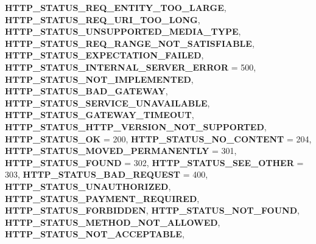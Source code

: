 \begin{DoxyCompactItemize}
{\bfseries H\+T\+T\+P\+\_\+\+S\+T\+A\+T\+U\+S\+\_\+\+R\+E\+Q\+\_\+\+E\+N\+T\+I\+T\+Y\+\_\+\+T\+O\+O\+\_\+\+L\+A\+R\+GE}, 
\newline
{\bfseries H\+T\+T\+P\+\_\+\+S\+T\+A\+T\+U\+S\+\_\+\+R\+E\+Q\+\_\+\+U\+R\+I\+\_\+\+T\+O\+O\+\_\+\+L\+O\+NG}, 
{\bfseries H\+T\+T\+P\+\_\+\+S\+T\+A\+T\+U\+S\+\_\+\+U\+N\+S\+U\+P\+P\+O\+R\+T\+E\+D\+\_\+\+M\+E\+D\+I\+A\+\_\+\+T\+Y\+PE}, 
{\bfseries H\+T\+T\+P\+\_\+\+S\+T\+A\+T\+U\+S\+\_\+\+R\+E\+Q\+\_\+\+R\+A\+N\+G\+E\+\_\+\+N\+O\+T\+\_\+\+S\+A\+T\+I\+S\+F\+I\+A\+B\+LE}, 
{\bfseries H\+T\+T\+P\+\_\+\+S\+T\+A\+T\+U\+S\+\_\+\+E\+X\+P\+E\+C\+T\+A\+T\+I\+O\+N\+\_\+\+F\+A\+I\+L\+ED}, 
\newline
{\bfseries H\+T\+T\+P\+\_\+\+S\+T\+A\+T\+U\+S\+\_\+\+I\+N\+T\+E\+R\+N\+A\+L\+\_\+\+S\+E\+R\+V\+E\+R\+\_\+\+E\+R\+R\+OR} = 500, 
{\bfseries H\+T\+T\+P\+\_\+\+S\+T\+A\+T\+U\+S\+\_\+\+N\+O\+T\+\_\+\+I\+M\+P\+L\+E\+M\+E\+N\+T\+ED}, 
{\bfseries H\+T\+T\+P\+\_\+\+S\+T\+A\+T\+U\+S\+\_\+\+B\+A\+D\+\_\+\+G\+A\+T\+E\+W\+AY}, 
{\bfseries H\+T\+T\+P\+\_\+\+S\+T\+A\+T\+U\+S\+\_\+\+S\+E\+R\+V\+I\+C\+E\+\_\+\+U\+N\+A\+V\+A\+I\+L\+A\+B\+LE}, 
\newline
{\bfseries H\+T\+T\+P\+\_\+\+S\+T\+A\+T\+U\+S\+\_\+\+G\+A\+T\+E\+W\+A\+Y\+\_\+\+T\+I\+M\+E\+O\+UT}, 
{\bfseries H\+T\+T\+P\+\_\+\+S\+T\+A\+T\+U\+S\+\_\+\+H\+T\+T\+P\+\_\+\+V\+E\+R\+S\+I\+O\+N\+\_\+\+N\+O\+T\+\_\+\+S\+U\+P\+P\+O\+R\+T\+ED}, 
{\bfseries H\+T\+T\+P\+\_\+\+S\+T\+A\+T\+U\+S\+\_\+\+OK} = 200, 
{\bfseries H\+T\+T\+P\+\_\+\+S\+T\+A\+T\+U\+S\+\_\+\+N\+O\+\_\+\+C\+O\+N\+T\+E\+NT} = 204, 
\newline
{\bfseries H\+T\+T\+P\+\_\+\+S\+T\+A\+T\+U\+S\+\_\+\+M\+O\+V\+E\+D\+\_\+\+P\+E\+R\+M\+A\+N\+E\+N\+T\+LY} = 301, 
{\bfseries H\+T\+T\+P\+\_\+\+S\+T\+A\+T\+U\+S\+\_\+\+F\+O\+U\+ND} = 302, 
{\bfseries H\+T\+T\+P\+\_\+\+S\+T\+A\+T\+U\+S\+\_\+\+S\+E\+E\+\_\+\+O\+T\+H\+ER} = 303, 
{\bfseries H\+T\+T\+P\+\_\+\+S\+T\+A\+T\+U\+S\+\_\+\+B\+A\+D\+\_\+\+R\+E\+Q\+U\+E\+ST} = 400, 
\newline
{\bfseries H\+T\+T\+P\+\_\+\+S\+T\+A\+T\+U\+S\+\_\+\+U\+N\+A\+U\+T\+H\+O\+R\+I\+Z\+ED}, 
{\bfseries H\+T\+T\+P\+\_\+\+S\+T\+A\+T\+U\+S\+\_\+\+P\+A\+Y\+M\+E\+N\+T\+\_\+\+R\+E\+Q\+U\+I\+R\+ED}, 
{\bfseries H\+T\+T\+P\+\_\+\+S\+T\+A\+T\+U\+S\+\_\+\+F\+O\+R\+B\+I\+D\+D\+EN}, 
{\bfseries H\+T\+T\+P\+\_\+\+S\+T\+A\+T\+U\+S\+\_\+\+N\+O\+T\+\_\+\+F\+O\+U\+ND}, 
\newline
{\bfseries H\+T\+T\+P\+\_\+\+S\+T\+A\+T\+U\+S\+\_\+\+M\+E\+T\+H\+O\+D\+\_\+\+N\+O\+T\+\_\+\+A\+L\+L\+O\+W\+ED}, 
{\bfseries H\+T\+T\+P\+\_\+\+S\+T\+A\+T\+U\+S\+\_\+\+N\+O\+T\+\_\+\+A\+C\+C\+E\+P\+T\+A\+B\+LE}, 

\end{DoxyCompactItemize}
